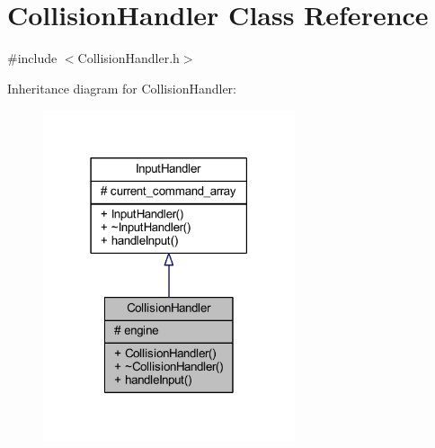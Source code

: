 \hypertarget{class_collision_handler}{}\section{Collision\+Handler Class Reference}
\label{class_collision_handler}


{\ttfamily \#include $<$Collision\+Handler.\+h$>$}



Inheritance diagram for Collision\+Handler\+:\nopagebreak
\begin{figure}[H]
\begin{center}
\leavevmode
\includegraphics[width=210pt]{class_collision_handler__inherit__graph}
\end{center}
\end{figure}


